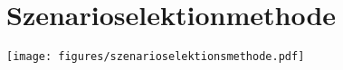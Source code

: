
\chapter{Szenarioselektionmethode}
\label{chapter:szenarioselectionmethod}

\noindent
\begin{minipage}{\textwidth}
  \centering
  \texttt{[image: figures/szenarioselektionsmethode.pdf]}
  \label{fig:szenarioselektionsmethode}
\end{minipage}